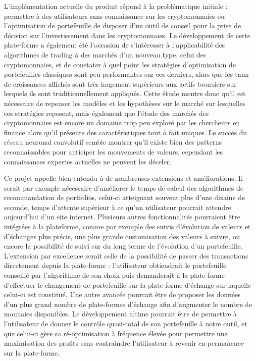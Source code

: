 \documentclass[a4paper, 10pt]{article}
\begin{document}
L'implémentation actuelle du produit répond à la problématique initiale : permettre à des utilisateurs sans connaissance sur les cryptomonnaies ou l'optimisation de portefeuille de disposer d'un outil de conseil pour la prise de décision sur l'investissement dans les cryptomonnaies. Le développement de cette plate-forme a également été l'occasion de s'intéresser à l'applicabilité des algorithmes de trading à des marchés d'un nouveau type, celui des cryptomonnaies, et de constater à quel point les stratégies d'optimisation de portefeuilles classiques sont peu performantes sur ces derniers, alors que les taux de croissances affichés sont très largement supérieurs aux actifs boursiers sur lesquels ils sont traditionnellement appliqués. Cette étude montre donc qu'il est nécessaire de repenser les modèles et les hypothèses sur le marché sur lesquelles ces stratégies reposent, mais également que l'étude des marchés des cryptomonnaies est encore un domaine trop peu exploré par les chercheurs en finance alors qu'il présente des caractéristiques tout à fait uniques. Le succès du réseau neuronal convolutif semble montrer qu'il existe bien des patterns reconnaissables pour anticiper les mouvements de valeurs, cependant les connaissances expertes actuelles ne peuvent les déceler.

Ce projet appelle bien entendu à de nombreuses extensions et améliorations. Il serait par exemple nécessaire d'améliorer le temps de calcul des algorithmes de recommandation de portfolios, celui-ci atteignant souvent plus d'une dizaine de seconde, temps d’attente supérieur à ce qu'un utilisateur pourrait attendre aujourd'hui d'un site internet. Plusieurs autres fonctionnalités pourraient être intégrées à la plateforme, comme par exemple des suivis d'évolution de valeurs et d'échanges plus précis, une plus grande customisation des valeurs à suivre, ou encore la possibilité de suivi sur du long terme de l'évolution d'un portefeuille. L'extension par excellence serait celle de la possibilité de passer des transactions directement depuis la plate-forme : l'utilisateur obtiendrait le portefeuille conseillé par l'algorithme de son choix puis demanderait à la plate-forme d'effectuer le changement de portefeuille sur la plate-forme d'échange sur laquelle celui-ci est constitué. Une autre avancée pourrait être de proposer les données d'un plus grand nombre de plate-formes d'échange afin d'augmenter le nombre de monnaies disponibles. Le développement ultime pourrait être de permettre à l'utilisateur de donner le contrôle quasi-total de son portefeuille à notre outil, et que celui-ci gère sa ré-optimisation à fréquence élevée pour permettre une maximisation des profits sans contraindre l'utilisateur à revenir en permanence sur la plate-forme.

\newpage
\printbibliography[heading=bibintoc]
\end{document}
